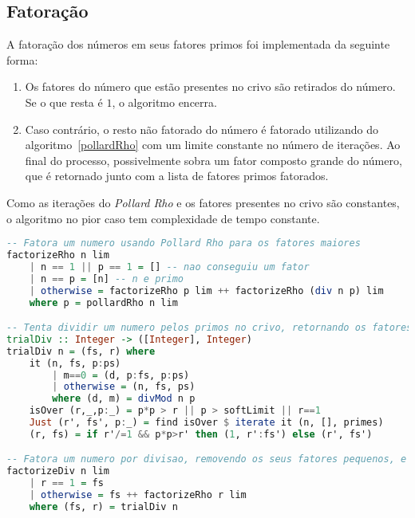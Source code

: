 \documentclass{article}
\begin{document}
\subsection{Fatoração}

A fatoração dos números em seus fatores primos foi implementada da seguinte forma:

\begin{enumerate}
\item Os fatores do número que estão presentes no crivo são retirados do número. Se o que resta é $1$, o algoritmo encerra.
\item Caso contrário, o resto não fatorado do número é fatorado utilizando do algoritmo~\ref{pollardRho} com um limite constante no número de iterações. Ao final do processo, possivelmente sobra um fator composto grande do número, que é retornado junto com a lista de fatores primos fatorados.
\end{enumerate}

Como as iterações do \textit{Pollard Rho} e os fatores presentes no crivo são constantes, o algoritmo no pior caso tem complexidade de tempo constante.

\noindent\hspace{0.03\linewidth}
\begin{minipage}{0.9\linewidth}
\begin{lstlisting}[language=haskell,caption=Fatoração]
-- Fatora um numero usando Pollard Rho para os fatores maiores
factorizeRho n lim
    | n == 1 || p == 1 = [] -- nao conseguiu um fator
    | n == p = [n] -- n e primo
    | otherwise = factorizeRho p lim ++ factorizeRho (div n p) lim
    where p = pollardRho n lim

-- Tenta dividir um numero pelos primos no crivo, retornando os fatores encontrados e o resto
trialDiv :: Integer -> ([Integer], Integer)
trialDiv n = (fs, r) where
    it (n, fs, p:ps)
        | m==0 = (d, p:fs, p:ps)
        | otherwise = (n, fs, ps)
        where (d, m) = divMod n p
    isOver (r,_,p:_) = p*p > r || p > softLimit || r==1
    Just (r', fs', p:_) = find isOver $ iterate it (n, [], primes)
    (r, fs) = if r'/=1 && p*p>r' then (1, r':fs') else (r', fs')

-- Fatora um numero por divisao, removendo os seus fatores pequenos, e entao usando Pollard Rho para os fatores maiores
factorizeDiv n lim
    | r == 1 = fs
    | otherwise = fs ++ factorizeRho r lim
    where (fs, r) = trialDiv n
\end{lstlisting}
\end{minipage}
\end{document}
